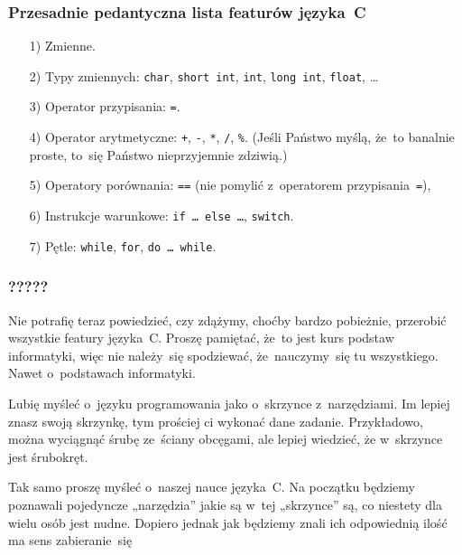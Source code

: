 \documentclass[10pt,t]{beamer}
\begin{document}
\begin{frame}
  \frametitle{Przesadnie pedantyczna lista featurów języka~C}


  \begin{itemize}

  \item[1)] Zmienne.

  \item[2)] Typy zmiennych: \texttt{char}, \texttt{short int}, \texttt{int},
    \texttt{long int}, \texttt{float}, \ldots

  \item[3)] Operator przypisania: \texttt{=}.

  \item[4)] Operator arytmetyczne: \texttt{+}, \texttt{-}, \texttt{*},
    \texttt{/}, \texttt{\%}.
    (Jeśli Państwo myślą, że~to banalnie proste, to~się Państwo
    nieprzyjemnie zdziwią.)

  \item[5)] Operatory porównania: \texttt{==} (nie pomylić z~operatorem
    przypisania~\texttt{=}),



  \item[6)] Instrukcje warunkowe: \texttt{if \ldots{} else \ldots}, \texttt{switch}.



  \item[7)] Pętle: \texttt{while}, \texttt{for}, \texttt{do \ldots{} while}.

  \end{itemize}

\end{frame}





\begin{frame}
  \frametitle{?????}


  Nie potrafię teraz powiedzieć, czy zdążymy, choćby bardzo pobieżnie,
  przerobić \alert{wszystkie} featury języka~C. Proszę pamiętać, że~to jest
  kurs \alert{podstaw informatyki}, więc nie należy~się spodziewać,
  że~nauczymy~się tu wszystkiego. Nawet o~podstawach informatyki.

  Lubię myśleć o~języku programowania jako o~skrzynce z~narzędziami.
  Im lepiej znasz swoją skrzynkę, tym prościej ci wykonać dane zadanie.
  Przykładowo, można wyciągnąć śrubę ze~ściany obcęgami, ale lepiej
  wiedzieć, że w~skrzynce jest śrubokręt.

  Tak samo proszę myśleć o~naszej nauce języka~C. Na początku będziemy
  poznawali pojedyncze „narzędzia” jakie są w~tej „skrzynce” są, co niestety
  dla wielu osób jest nudne. Dopiero jednak jak będziemy znali ich
  odpowiednią ilość ma sens zabieranie~się

\end{frame}
\end{document}
